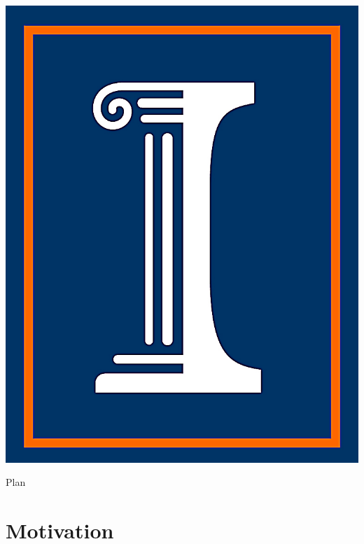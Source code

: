 \documentclass{beamer}
\begin{document}
\begin{frame}
  \titlepage
  \centering
  \includegraphics[scale = 0.25]{UIUC_logo}
\end{frame}

\begin{frame}{Plan}
  \tableofcontents
\end{frame}


\section{Motivation}
\end{document}
